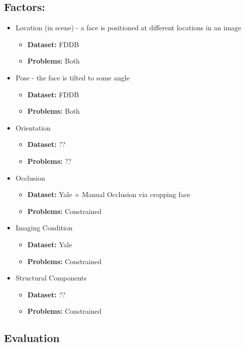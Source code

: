 \documentclass[11pt]{article} %
\theoremstyle{plain}
\theoremstyle{definition}
\theoremstyle{remark}
\numberwithin{equation}{section} %
\numberwithin{figure}{section} %
\numberwithin{table}{section} %
\begin{document}
\subsection{Factors:}
\begin{itemize}
  \item Location (in scene) - a face is positioned at different locations in an image
  \begin{itemize}
    \item \textbf{Dataset:} FDDB
    \item \textbf{Problems:} Both 
  \end{itemize}
  \item Pose - the face is tilted to some angle
  \begin{itemize}
    \item \textbf{Dataset:} FDDB
    \item \textbf{Problems:} Both 
  \end{itemize}
    \item Orientation
  \begin{itemize}
    \item \textbf{Dataset:} ??
    \item \textbf{Problems:} ??
  \end{itemize}
  \item Occlusion
  \begin{itemize}
    \item \textbf{Dataset:} Yale + Manual Occlusion via cropping face
    \item \textbf{Problems:} Constrained 
  \end{itemize}
  \item Imaging Condition
  \begin{itemize}
    \item \textbf{Dataset:} Yale
    \item \textbf{Problems:} Constrained
  \end{itemize}
  \item Structural Components

  \begin{itemize}
    \item \textbf{Dataset:} ??
    \item \textbf{Problems:} Constrained
  \end{itemize}
\end{itemize}

\subsection{Evaluation}
\end{document}

